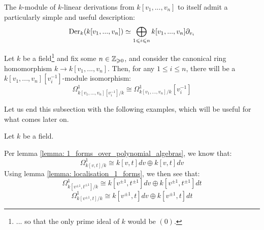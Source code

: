         \begin{corollary}
            The $k$-module of $k$-linear derivations from $k[v_1, ..., v_n]$ to itself admit a particularly simple and useful description:
                $$\mathrm{Der}_k(k[v_1, ..., v_n]) \simeq \bigoplus_{1 \leqslant i \leqslant n} k[v_1, ..., v_n] \partial_{v_i}$$
        \end{corollary}
        \begin{lemma} \label{lemma: localisation_1_forms}
            \cite[\href{https://stacks.math.columbia.edu/tag/031G}{Tag 031G}]{stacks} Let $k$ be a field\footnote{... so that the only prime ideal of $k$ would be $(0)$.} and fix some $n \in \mathbb{Z}_{\geqslant 0}$, and consider the canonical ring homomorphism $k \to k[v_1, ..., v_n]$. Then, for any $1 \leq i \leq n$, there will be a $k[v_1, ..., v_n][v_i^{-1}]$-module isomorphism:
                $$\Omega^1_{k[v_1, ..., v_n][v_i^{-1}]/k} \cong \Omega^1_{k[v_1, ..., v_n]/k}[v_i^{-1}]$$
        \end{lemma}

        Let us end this subsection with the following examples, which will be useful for what comes later on.
        \begin{example}
            Let $k$ be a field.
        
            Per lemma \ref{lemma: 1_forms_over_polynomial_algebras}, we know that:
                $$\Omega^1_{k[v, t]/k} \cong k[v, t] dv \oplus k[v, t] dv$$
            Using lemma \ref{lemma: localisation_1_forms}, we then see that:
                $$\Omega^1_{k[v^{\pm 1}, t^{\pm 1}]/k} \cong k[v^{\pm 1}, t^{\pm 1}] dv \oplus k[v^{\pm 1}, t^{\pm 1}] dt$$
                $$\Omega^1_{k[v^{\pm 1}, t]/k} \cong k[v^{\pm 1}, t] dv \oplus k[v^{\pm 1}, t] dt$$
        \end{example}

